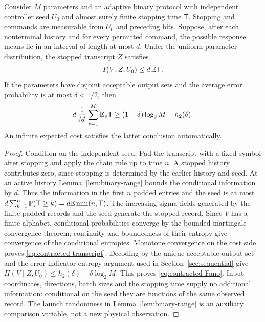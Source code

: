 \begin{proposition}
\label{prop:stopped-contraction}
Consider $M$ parameters and an adaptive binary protocol with independent
controller seed $U_0$ and almost surely finite stopping time $\mathsf T$.
Stopping and commands are measurable from $U_0$ and preceding bits.
Suppose, after each nonterminal history and for every permitted command,
the possible response means lie in an interval of length at most $d$.
Under the uniform parameter distribution, the stopped transcript $Z$
satisfies
\begin{equation}\label{eq:contracted-transcript}
                         I(V;Z,U_0)\le d\,\mathbb E\mathsf T.
\end{equation}
If the parameters have disjoint acceptable output sets and the average
error probability is at most $\delta<1/2$, then
\begin{equation}\label{eq:contracted-Fano}
 d\,\frac1M\sum_{v=1}^M\mathbb E_v\mathsf T
                 \ge (1-\delta)\log_2M-h_2(\delta).
\end{equation}
An infinite expected cost satisfies the latter conclusion automatically.
\end{proposition}
\begin{proof}
Condition on the independent seed. Pad the transcript with a fixed
symbol after stopping and apply the chain rule up to time $n$.
A stopped history contributes zero, since stopping is determined by the
earlier history and seed. At an active history Lemma~\ref{lem:binary-range}
bounds the conditional information by $d$. Thus the information in the
first $n$ padded entries and the seed is at most
$d\sum_{k=1}^n\mathbb P(\mathsf T\ge k)=d\mathbb E\min(n,\mathsf T)$.
The increasing sigma fields generated by the finite padded records and
the seed generate the stopped record. Since $V$ has a finite alphabet,
conditional probabilities converge by the bounded martingale convergence
theorem; continuity and boundedness of their entropy give convergence
of the conditional entropies. Monotone convergence on the cost side
proves \eqref{eq:contracted-transcript}. Decoding by the unique acceptable
output set and the error-indicator entropy argument used in
Section~\ref{sec:sequential} give
$H(V\mid Z,U_0)\le h_2(\delta)+\delta\log_2M$.
This proves \eqref{eq:contracted-Fano}. Input coordinates, directions,
batch sizes and the stopping time supply no additional information:
conditional on the seed they are functions of the same observed record.
The launch randomness in Lemma~\ref{lem:binary-range} is an auxiliary
comparison variable, not a new physical observation.
\end{proof}

